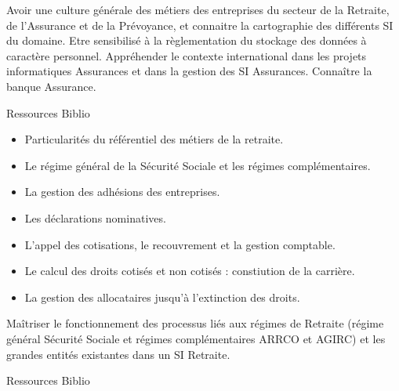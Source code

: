 {} 
{\begin{itemize} 
  \ObjItem Avoir une culture générale des métiers des entreprises du secteur de la
Retraite, de l'Assurance et de la Prévoyance, et connaitre la cartographie
des différents SI du domaine.
  \ObjItem Etre sensibilisé à la règlementation du stockage des données à caractère
personnel.
  \ObjItem Appréhender le contexte international dans les projets informatiques
Assurances et dans la gestion des SI Assurances. Connaître la banque
Assurance.
\end{itemize} 
} 
{Ressources} 
{Biblio} 
 
\vfill

{
\begin{itemize} 
\item Particularités du référentiel des métiers de la retraite.
\item Le régime général de la Sécurité Sociale et les régimes complémentaires.
\item La gestion des adhésions des entreprises.
\item Les déclarations nominatives.
\item L'appel des cotisations, le recouvrement et la gestion comptable.
\item Le calcul des droits cotisés et non cotisés : constiution de la carrière.
\item La gestion des allocataires jusqu'à l'extinction des droits.
\end{itemize}
} 
{} 
{\begin{itemize} 
  \ObjItem Maîtriser le fonctionnement des processus liés aux régimes de Retraite
(régime général Sécurité Sociale et régimes complémentaires ARRCO et
AGIRC) et les grandes entités existantes dans un SI Retraite.
\end{itemize} 
} 
{Ressources} 
{Biblio} 
 
